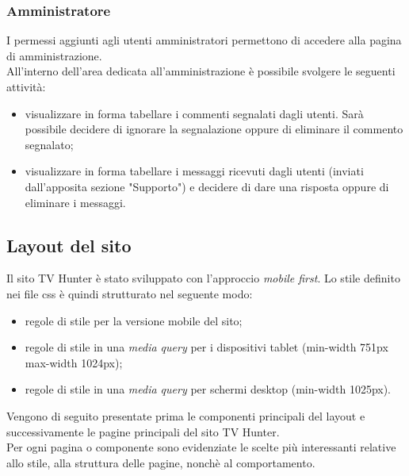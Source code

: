 \subsubsection{Amministratore}
I permessi aggiunti agli utenti amministratori permettono di accedere alla pagina di amministrazione.\\
All'interno dell'area dedicata all'amministrazione è possibile svolgere le seguenti attività:
\begin{itemize}
	\item visualizzare in forma tabellare i commenti segnalati dagli utenti. Sarà possibile decidere di ignorare la segnalazione oppure di eliminare il commento segnalato;
	\item visualizzare in forma tabellare i messaggi ricevuti dagli utenti (inviati dall'apposita sezione "Supporto") e decidere di dare una risposta oppure di eliminare i messaggi.
\end{itemize}

\subsection{Layout del sito}
Il sito TV Hunter è stato sviluppato con l'approccio \textit{mobile first}. Lo stile definito nei file css è quindi strutturato nel seguente modo:
\begin{itemize}
	\item regole di stile per la versione mobile del sito;
	\item regole di stile in una \textit{media query} per i dispositivi tablet (min-width 751px max-width 1024px);
	\item regole di stile in una \textit{media query} per schermi desktop (min-width 1025px).
\end{itemize}
Vengono di seguito presentate prima le componenti principali del layout e successivamente le pagine principali del sito TV Hunter. \\
Per ogni pagina o componente sono evidenziate le scelte più interessanti relative allo stile, alla struttura delle pagine, nonchè al comportamento.

